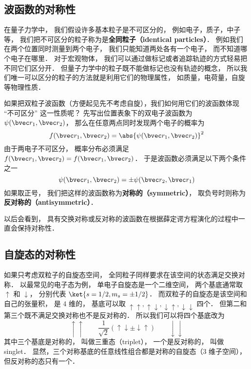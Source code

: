 
\subsection{波函数的对称性}
在量子力学中， 我们假设许多基本粒子是不可区分的， 例如电子，质子，中子等， 我们把不可区分的粒子称为是\textbf{全同粒子（identical particles）}． 例如我们在两个位置同时测量到两个电子， 我们只能知道两处各有一个电子， 而不知道哪个电子在哪里． 对于宏观物体， 我们可以通过做标记或者追踪轨迹的方式轻易把不同它们区分开． 但量子力学中的粒子既不能做标记也没有轨迹的概念， 所以我们唯一可以区分的粒子的方法就是利用它们的物理属性， 如质量，电荷量，自旋等物理性质．

如果把双粒子波函数（方便起见先不考虑自旋），我们如何用它们的波函数体现 “不可区分” 这一性质呢？ 先写出位置表象下的双电子波函数为 $\psi(\bvec r_1, \bvec r_2)$， 那么在任意两点同时发现两个电子的概率为
$$
f(\bvec r_1, \bvec r_2) = \abs{\psi(\bvec r_1, \bvec r_2)}^2
$$
由于两电子不可区分， 概率分布必须满足 $f(\bvec r_1, \bvec r_2) = f(\bvec r_1, \bvec r_2)$． 于是波函数必须满足以下两个条件之一
\begin{equation}
\psi(\bvec r_1, \bvec r_2) = \pm \psi(\bvec r_2, \bvec r_1)
\end{equation}
如果取正号， 我们把这样的波函数称为\textbf{对称的（symmetric）}， 取负号时则称为\textbf{反对称的（antisymmetric）}．

以后会看到，%
 具有交换对称或反对称的波函数在根据薛定谔方程演化的过程中一直会保持对称性．

\subsection{自旋态的对称性}
如果只考虑双粒子的自旋态空间， 全同粒子同样要求在该空间的状态满足交换对称． 以最常见的电子态为例， 单电子自旋态是一个二维空间， 两个基底通常取 $\uparrow$ 和 $\downarrow$， 分别代表 $\ket{s=1/2,m_s=\pm 1/2}$． 而双粒子的自旋态是该空间和自己的张量积， 是 4 维的， 基底可以取 $\uparrow\uparrow, \uparrow\downarrow, \downarrow\uparrow, \downarrow\downarrow$ 四个． 但第二和第三个既不满足交换对称也不是反对称的． 所以我们可以将四个基底改为
\begin{equation}
\uparrow\uparrow \qquad \frac{1}{\sqrt 2}(\uparrow\downarrow \pm \downarrow\uparrow) \qquad \downarrow\downarrow
\end{equation}
其中三个基底是对称的， 叫做三重态（triplet）， 一个是反对称的， 叫做 singlet． 显然，三个对称基底的任意线性组合都是对称的自旋态（3 维子空间）， 但反对称的态只有一个．

